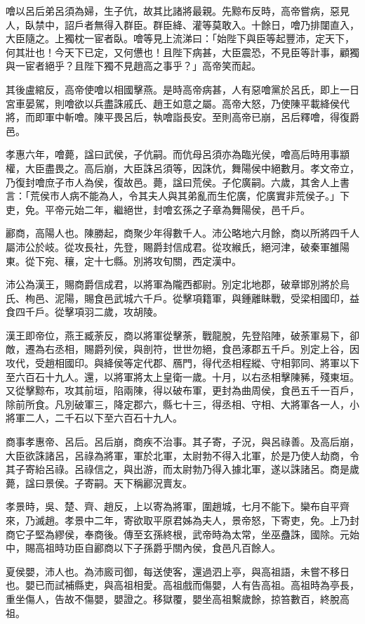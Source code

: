 \begin{pinyinscope}
噲以呂后弟呂須為婦，生子伉，故其比諸將最親。先黥布反時，高帝嘗病，惡見人，臥禁中，詔戶者無得入群臣。群臣絳、灌等莫敢入。十餘日，噲乃排闥直入，大臣隨之。上獨枕一宦者臥。噲等見上流涕曰：「始陛下與臣等起豐沛，定天下，何其壯也！今天下已定，又何憊也！且陛下病甚，大臣震恐，不見臣等計事，顧獨與一宦者絕乎？且陛下獨不見趙高之事乎？」高帝笑而起。

其後盧綰反，高帝使噲以相國擊燕。是時高帝病甚，人有惡噲黨於呂氏，即上一日宮車晏駕，則噲欲以兵盡誅戚氏、趙王如意之屬。高帝大怒，乃使陳平載絳侯代將，而即軍中斬噲。陳平畏呂后，執噲詣長安。至則高帝已崩，呂后釋噲，得復爵邑。

孝惠六年，噲薨，諡曰武侯，子伉嗣。而伉母呂須亦為臨光侯，噲高后時用事顓權，大臣盡畏之。高后崩，大臣誅呂須等，因誅伉，舞陽侯中絕數月。孝文帝立，乃復封噲庶子市人為侯，復故邑。薨，諡曰荒侯。子佗廣嗣。六歲，其舍人上書言：「荒侯巿人病不能為人，令其夫人與其弟亂而生佗廣，佗廣實非荒侯子。」下吏，免。平帝元始二年，繼絕世，封噲玄孫之子章為舞陽侯，邑千戶。

酈商，高陽人也。陳勝起，商聚少年得數千人。沛公略地六月餘，商以所將四千人屬沛公於岐。從攻長社，先登，賜爵封信成君。從攻緱氏，絕河津，破秦軍雒陽東。從下宛、穰，定十七縣。別將攻旬關，西定漢中。

沛公為漢王，賜商爵信成君，以將軍為隴西都尉。別定北地郡，破章邯別將於烏氏、栒邑、泥陽，賜食邑武城六千戶。從擊項籍軍，與鍾離眛戰，受梁相國印，益食四千戶。從擊項羽二歲，攻胡陵。

漢王即帝位，燕王臧荼反，商以將軍從擊荼，戰龍脫，先登陷陣，破荼軍易下，卻敵，遷為右丞相，賜爵列侯，與剖符，世世勿絕，食邑涿郡五千戶。別定上谷，因攻代，受趙相國印。與絳侯等定代郡、鴈門，得代丞相程縱、守相郭同、將軍以下至六百石十九人。還，以將軍將太上皇衛一歲。十月，以右丞相擊陳豨，殘東垣。又從擊黥布，攻其前垣，陷兩陳，得以破布軍，更封為曲周侯，食邑五千一百戶，除前所食。凡別破軍三，降定郡六，縣七十三，得丞相、守相、大將軍各一人，小將軍二人，二千石以下至六百石十九人。

商事孝惠帝、呂后。呂后崩，商疾不治事。其子寄，子況，與呂祿善。及高后崩，大臣欲誅諸呂，呂祿為將軍，軍於北軍，太尉勃不得入北軍，於是乃使人劫商，令其子寄紿呂祿。呂祿信之，與出游，而太尉勃乃得入據北軍，遂以誅諸呂。商是歲薨，諡曰景侯。子寄嗣。天下稱酈況賣友。

孝景時，吳、楚、齊、趙反，上以寄為將軍，圍趙城，七月不能下。欒布自平齊來，乃滅趙。孝景中二年，寄欲取平原君姊為夫人，景帝怒，下寄吏，免。上乃封商它子堅為繆侯，奉商後。傳至玄孫終根，武帝時為太常，坐巫蠱誅，國除。元始中，賜高祖時功臣自酈商以下子孫爵乎關內侯，食邑凡百餘人。

夏侯嬰，沛人也。為沛廄司御，每送使客，還過泗上亭，與高祖語，未嘗不移日也。嬰已而試補縣吏，與高祖相愛。高祖戲而傷嬰，人有告高祖。高祖時為亭長，重坐傷人，告故不傷嬰，嬰證之。移獄覆，嬰坐高祖繫歲餘，掠笞數百，終脫高祖。


\end{pinyinscope}
